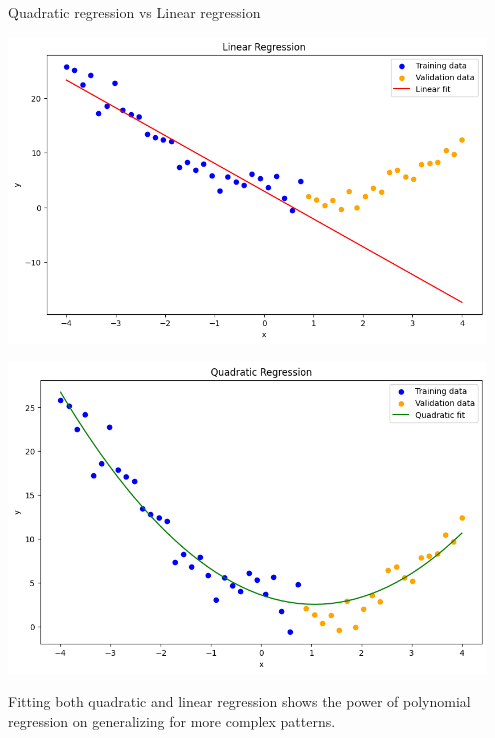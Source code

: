 \documentclass[serif, aspectratio=169]{beamer}
\begin{document}
\begin{frame}{Quadratic regression vs Linear regression}
    \begin{minipage}{0.48\textwidth}
        \centering
        \includegraphics[width=0.95\textwidth]{pic/Polynomial_regression/linear_regression.png}
    \end{minipage} %
    \begin{minipage}{0.48\textwidth}
        \centering
        \includegraphics[width=0.95\textwidth]{pic/Polynomial_regression/quadratic_regression.png}
    \end{minipage}
    \vfile
    \begin{center}
        Fitting both quadratic and linear regression shows the power of polynomial regression on generalizing for more complex patterns.
    \end{center}
\end{frame}

    
\end{document}
